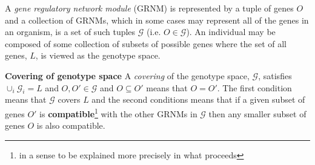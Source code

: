 \begin{frame}
A \emph{gene regulatory network module} (GRNM) is represented by a tuple of genes $O$ and a collection of GRNMs, which in some cases may represent all of the genes in an organism, is a set of such tuples $\mathcal{G}$ (i.e. $O \in \mathcal{G}$). An individual may be composed of some collection of subsets of possible genes where the set of all genes, $L$, is viewed as the genotype space.
\begin{block}{\textbf{Covering of genotype space}}
A \emph{covering} of the genotype space, $\mathcal{G}$, satisfies $\cup_i \mathcal{G}_i = L$ and $O,O' \in \mathcal{G}$ and $O \subseteq O'$ means that $O = O'$. The first condition means that $\mathcal{G}$ covers $L$ and the second conditions means that if a given subset of genes $O'$ is \textbf{compatible}\footnote{in a sense to be explained more precisely in what proceeds} with the other GRNMs in $\mathcal{G}$ then any smaller subset of genes $O$ is also compatible.
\end{block}
\end{frame}
